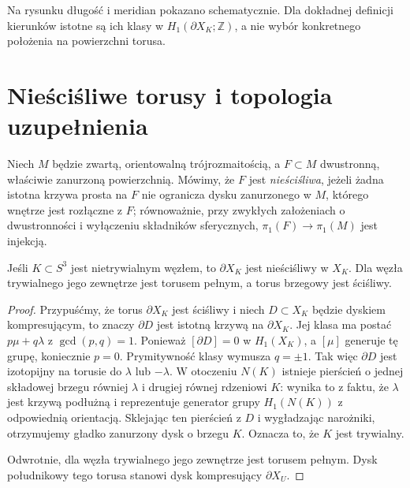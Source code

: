 \begin{uwaga}
Na rysunku długość i meridian pokazano schematycznie.
Dla dokładnej definicji kierunków istotne są ich klasy w
$H_1(\partial X_K;\mathbb Z)$, a nie wybór konkretnego
położenia na powierzchni torusa.
\end{uwaga}

\section{Nieściśliwe torusy i topologia uzupełnienia}
\label{sec:kt-torus-jsj}

\begin{definicja}
Niech $M$ będzie zwartą, orientowalną trójrozmaitością,
a $F\subset M$ dwustronną, właściwie zanurzoną powierzchnią.
Mówimy, że $F$ jest \emph{nieściśliwa}, jeżeli żadna istotna
krzywa prosta na $F$ nie ogranicza dysku zanurzonego w $M$,
którego wnętrze jest rozłączne z $F$; równoważnie, przy zwykłych
założeniach o dwustronności i wyłączeniu składników sferycznych,
$\pi_1(F)\to\pi_1(M)$ jest injekcją.
\end{definicja}

\begin{stwierdzenie}
Jeśli $K\subset S^3$ jest nietrywialnym węzłem, to
$\partial X_K$ jest nieściśliwy w $X_K$.
Dla węzła trywialnego jego zewnętrze jest torusem pełnym,
a torus brzegowy jest ściśliwy.
\end{stwierdzenie}

\begin{proof}
Przypuśćmy, że torus $\partial X_K$ jest ściśliwy i niech
$D\subset X_K$ będzie dyskiem kompresującym, to znaczy
$\partial D$ jest istotną krzywą na $\partial X_K$.
Jej klasa ma postać $p\mu+q\lambda$ z
$\gcd(p,q)=1$. Ponieważ $[\partial D]=0$ w $H_1(X_K)$,
a $[\mu]$ generuje tę grupę, koniecznie $p=0$.
Prymitywność klasy wymusza $q=\pm1$.
Tak więc $\partial D$ jest izotopijny na torusie do
$\lambda$ lub $-\lambda$. W otoczeniu $N(K)$ istnieje
pierścień o jednej składowej brzegu równiej $\lambda$
i drugiej równej rdzeniowi $K$: wynika to z faktu, że
$\lambda$ jest krzywą podłużną i reprezentuje generator
grupy $H_1(N(K))$ z odpowiednią orientacją.
Sklejając ten pierścień z $D$ i wygładzając narożniki,
otrzymujemy gładko zanurzony dysk o brzegu $K$.
Oznacza to, że $K$ jest trywialny.

Odwrotnie, dla węzła trywialnego jego zewnętrze jest
torusem pełnym. Dysk południkowy tego torusa stanowi
dysk kompresujący $\partial X_U$.
\end{proof}

